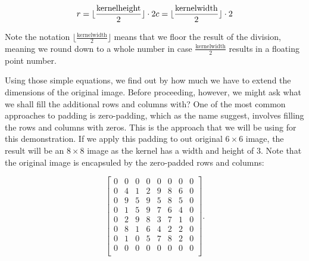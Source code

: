 \documentclass[%
oneside,                 %
final,                   %
10pt]{article}
\begin{document}
\[
r =\lfloor \frac{\mathrm{kernel height}}{2} \rfloor \cdot 2 \\
c =\lfloor \frac{\mathrm{kernel width}}{2} \rfloor \cdot 2
\]

Note the notation $\lfloor \frac{\mathrm{kernel width}}{2} \rfloor$ means that
we floor the result of the division, meaning we round down to a whole
number in case $\frac{\mathrm{kernel width}}{2}$ results in a floating point
number.

Using those simple equations, we find out by how much we have to
extend the dimensions of the original image. Before proceeding,
however, we might ask what we shall fill the additional rows and
columns with? One of the most common approaches to padding is
zero-padding, which as the name suggest, involves filling the rows and
columns with zeros. This is the approach that we will be using for
this demonstration. If we apply this padding to out original $6 \times 6$
image, the result will be an $8 \times 8$ image as the kernel has a width and
height of 3. Note that the original image is encapsuled by the
zero-padded rows and columns:

\[
\begin{bmatrix}
0 & 0 & 0 & 0 & 0 & 0 & 0 & 0 \\
0 & 4 & 1 & 2 & 9 & 8 & 6 & 0 \\
0 & 9 & 5 & 9 & 5 & 8 & 5 & 0 \\
0 & 1 & 5 & 9 & 7 & 6 & 4 & 0 \\
0 & 2 & 9 & 8 & 3 & 7 & 1 & 0 \\
0 & 8 & 1 & 6 & 4 & 2 & 2 & 0 \\
0 & 1 & 0 & 5 & 7 & 8 & 2 & 0 \\
0 & 0 & 0 & 0 & 0 & 0 & 0 & 0 \\
\end{bmatrix}.
\]
\end{document}
